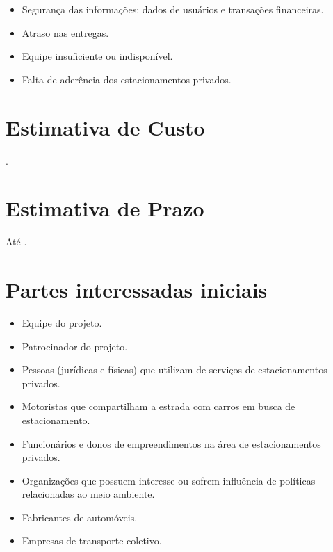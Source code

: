 \begin{itemize}
	\item Segurança das informações: dados de usuários e transações financeiras.
	\item Atraso nas entregas.
	\item Equipe insuficiente ou indisponível.
	\item Falta de aderência dos estacionamentos privados. %
\end{itemize}

\section{Estimativa de Custo}

\maximumBudget{}.

\section{Estimativa de Prazo}

Até \maximumDeadline{}.

\section{Partes interessadas iniciais}

\begin{itemize}
	\item Equipe do projeto.
	\item Patrocinador do projeto.
	\item Pessoas (jurídicas e físicas) que utilizam de serviços de estacionamentos privados.
	\item Motoristas que compartilham a estrada com carros em busca de estacionamento.
	\item Funcionários e donos de empreendimentos na área de estacionamentos privados.
	\item Organizações que possuem interesse ou sofrem influência de políticas relacionadas ao meio ambiente.
	\item Fabricantes de automóveis.
	\item Empresas de transporte coletivo.
\end{itemize}



